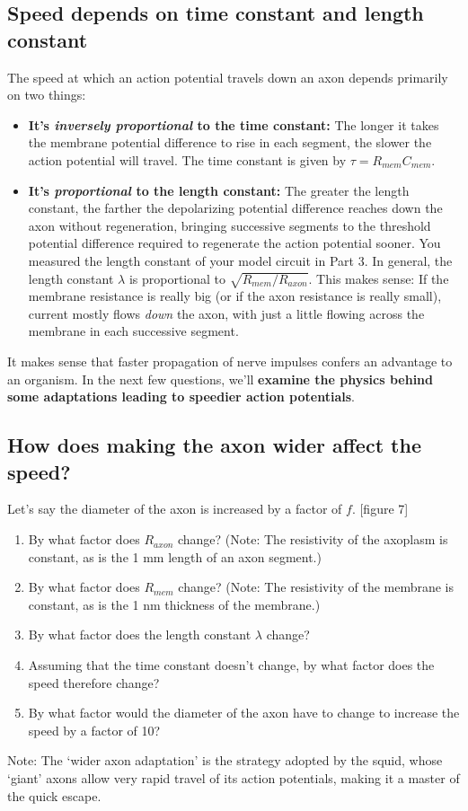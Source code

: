\subsection*{Speed depends on time constant and length constant}
The speed at which an action potential travels down an axon depends primarily on two things:
\begin{itemize}
\itemsep-0.2em
\item \textbf{It's \emph{inversely proportional} to the time constant:} The longer it takes the membrane potential difference to rise in each segment, the slower the action potential will travel. The time constant is given by $\tau = R_{mem}C_{mem}$.
\item \textbf{It's \emph{proportional} to the length constant:} The greater the length constant, the farther the depolarizing potential difference reaches down the axon without regeneration, bringing successive segments to the threshold potential difference required to regenerate the action potential sooner. You measured the length constant of your model circuit in Part 3. In general, the length constant $\lambda$ is proportional to $\sqrt{R_{mem}/R_{axon}}$. This makes sense: If the membrane resistance is really big (or if the axon resistance is really small), current mostly flows \emph{down} the axon, with just a little flowing across the membrane in each successive segment.
\end{itemize}
\par 
It makes sense that faster propagation of nerve impulses confers an advantage to an organism.
In the next few questions, we'll \textbf{examine the physics behind some adaptations leading to speedier action potentials}.

\subsection*{How does making the axon wider affect the speed?}
Let's say the diameter of the axon is increased by a factor of $f$. [figure 7]
\begin{enumerate}
\itemsep-0.2em
\item By what factor does $R_{axon}$ change? (Note: The resistivity of the axoplasm is constant, as is the 1 mm length of an axon segment.)
\item By what factor does $R_{mem}$ change? (Note: The resistivity of the membrane is constant, as is the 1 nm thickness of the membrane.)
\item By what factor does the length constant $\lambda$ change?
\item Assuming that the time constant doesn't change, by what factor does the speed therefore change?
\item By what factor would the diameter of the axon have to change to increase the speed by a factor of 10?
\end{enumerate}
Note: The `wider axon adaptation' is the strategy adopted by the squid, whose `giant' axons allow very rapid travel of its action potentials, making it a master of the quick escape.

